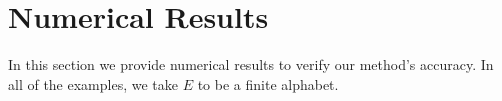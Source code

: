 \documentclass[10pt]{article}
\newcommand{\fracn}{\frac{n}{2}}
\theoremstyle{definition}
\numberwithin{equation}{section}
\numberwithin{figure}{section}
\numberwithin{table}{section}
\begin{document}

\section{Numerical Results}

In this section we provide numerical results to verify our method's accuracy. In all of the examples, we take $E$ to be a finite alphabet.
\end{document}
